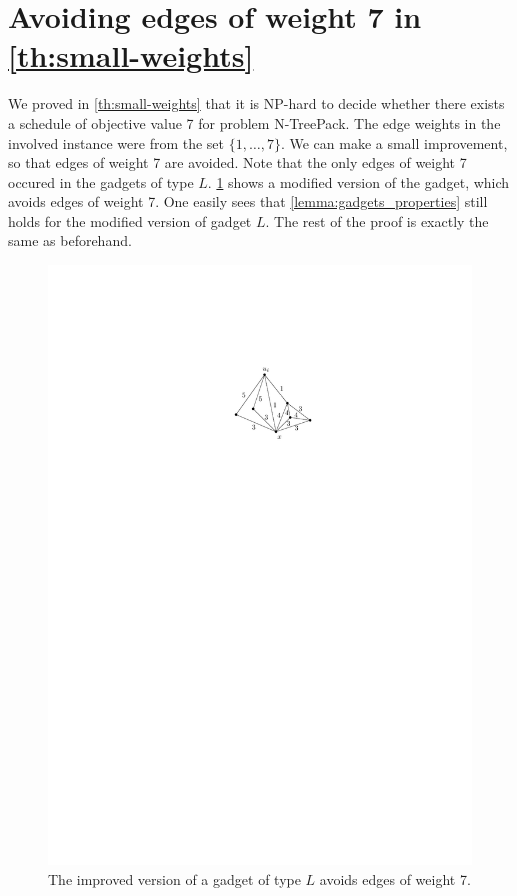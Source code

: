 \documentclass[runningheads]{llncs}
\newcommand{\set}[1]{\{ #1 \}}
\newcommand{\fromto}[2]{\set{#1, \ldots, #2}}
\newcommand{\xxxNTP}{{\sc N-TreePack}}
\begin{document}
\section{Avoiding edges of weight 7 in \cref{th:small-weights}}
\label{appendix:small-weights-improvement}
We proved in \cref{th:small-weights} that it is NP-hard to decide whether there exists a schedule of objective value 7 for problem {\xxxNTP}. The edge weights in the involved instance were from the set $\fromto{1}{7}$. We can make a small improvement, so that edges of weight 7 are avoided. Note that the only edges of weight 7 occured in the gadgets of type $L$. \cref{fig_hamilton_cycle_improved} shows a modified version of the gadget, which avoids edges of weight 7. One easily sees that \cref{lemma:gadgets_properties} still holds for the modified version of gadget $L$. The rest of the proof is exactly the same as beforehand.
\begin{figure}[htpb]
\centering
\includegraphics[scale=1]{img/act-hamilton-cycle-b}
\caption{The improved version of a gadget of type $L$ avoids edges of weight 7.}
\label{fig_hamilton_cycle_improved}
\end{figure}
\end{document}
